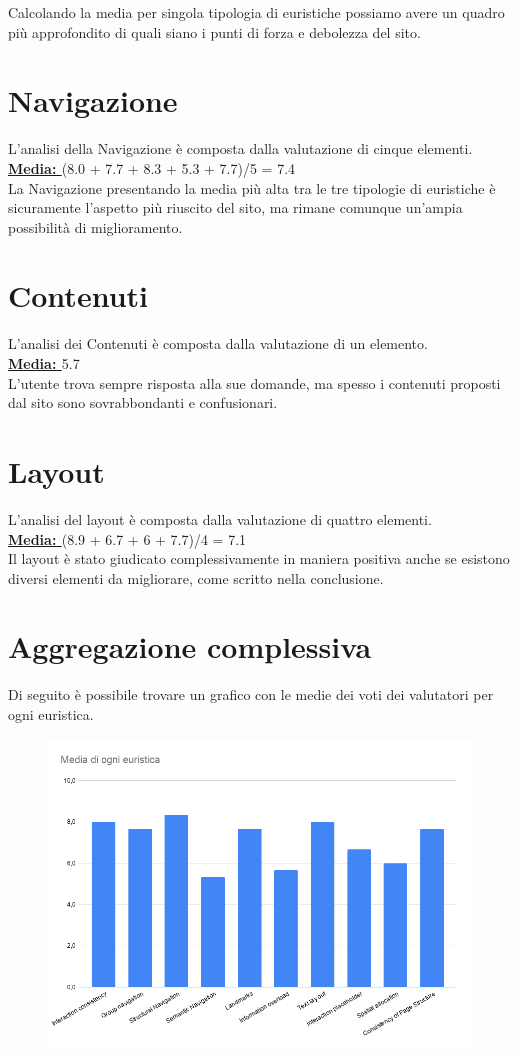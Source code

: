 Calcolando la media per singola tipologia di euristiche possiamo avere un quadro
più approfondito di quali siano i punti di forza e debolezza del sito.
\section{\textbf{Navigazione}}
L'analisi della Navigazione è composta dalla valutazione di cinque elementi.\\
\textbf{\underline{Media: }}(8.0 + 7.7 + 8.3 + 5.3 + 7.7)/5 = 7.4 \\
La Navigazione presentando la media più alta tra le tre tipologie di euristiche è sicuramente
l'aspetto più riuscito del sito, ma rimane comunque un'ampia possibilità di miglioramento.

\section{\textbf{Contenuti}}
L'analisi dei Contenuti è composta dalla valutazione di un elemento.\\
\textbf{\underline{Media: }} 5.7\\ L'utente trova sempre risposta alla sue
domande, ma spesso i contenuti proposti dal sito sono sovrabbondanti e
confusionari.


\section{\textbf{Layout}}
L'analisi del layout è composta dalla valutazione di quattro elementi.\\
\textbf{\underline{Media: }}(8.9 + 6.7 + 6 + 7.7)/4 = 7.1\\
Il layout è stato giudicato complessivamente in maniera positiva anche se
esistono diversi elementi da migliorare, come scritto nella conclusione. 
\section{\textbf{Aggregazione complessiva}}
Di seguito è possibile trovare un grafico 
    con le medie dei voti dei valutatori per ogni euristica.
    \begin{figure}[H]
        \centering
        \includegraphics[scale=0.43]{resources/images/graficoMedieEuristiche.png}
    \end{figure}

